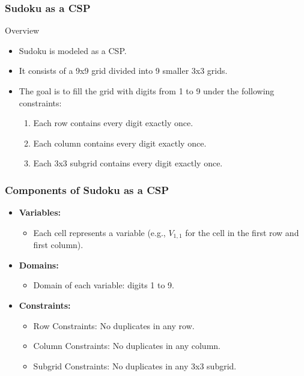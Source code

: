 \documentclass[aspectratio=169]{beamer}
\begin{document}
\begin{frame}
    \frametitle{Sudoku as a CSP}
    \begin{block}{Overview}
        \begin{itemize}
            \item Sudoku is modeled as a CSP.
            \item It consists of a 9x9 grid divided into 9 smaller 3x3 grids.
            \item The goal is to fill the grid with digits from 1 to 9 under the following constraints:
            \begin{enumerate}
                \item Each row contains every digit exactly once.
                \item Each column contains every digit exactly once.
                \item Each 3x3 subgrid contains every digit exactly once.
            \end{enumerate}
        \end{itemize}
    \end{block}
\end{frame}

\begin{frame}
    \frametitle{Components of Sudoku as a CSP}
    \begin{itemize}
        \item \textbf{Variables:}
        \begin{itemize}
            \item Each cell represents a variable (e.g., \( V_{1,1} \) for the cell in the first row and first column).
        \end{itemize}
        \item \textbf{Domains:}
        \begin{itemize}
            \item Domain of each variable: digits 1 to 9.
        \end{itemize}
        \item \textbf{Constraints:}
        \begin{itemize}
            \item Row Constraints: No duplicates in any row.
            \item Column Constraints: No duplicates in any column.
            \item Subgrid Constraints: No duplicates in any 3x3 subgrid.
        \end{itemize}
    \end{itemize}
\end{frame}
\end{document}
